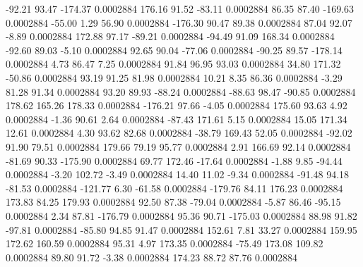       -92.21       93.47     -174.37     0.0002884
      176.16       91.52      -83.11     0.0002884
       86.35       87.40     -169.63     0.0002884
      -55.00        1.29       56.90     0.0002884
     -176.30       90.47       89.38     0.0002884
       87.04       92.07       -8.89     0.0002884
      172.88       97.17      -89.21     0.0002884
      -94.49       91.09      168.34     0.0002884
      -92.60       89.03       -5.10     0.0002884
       92.65       90.04      -77.06     0.0002884
      -90.25       89.57     -178.14     0.0002884
        4.73       86.47        7.25     0.0002884
       91.84       96.95       93.03     0.0002884
       34.80      171.32      -50.86     0.0002884
       93.19       91.25       81.98     0.0002884
       10.21        8.35       86.36     0.0002884
       -3.29       81.28       91.34     0.0002884
       93.20       89.93      -88.24     0.0002884
      -88.63       98.47      -90.85     0.0002884
      178.62      165.26      178.33     0.0002884
     -176.21       97.66       -4.05     0.0002884
      175.60       93.63        4.92     0.0002884
       -1.36       90.61        2.64     0.0002884
      -87.43      171.61        5.15     0.0002884
       15.05      171.34       12.61     0.0002884
        4.30       93.62       82.68     0.0002884
      -38.79      169.43       52.05     0.0002884
      -92.02       91.90       79.51     0.0002884
      179.66       79.19       95.77     0.0002884
        2.91      166.69       92.14     0.0002884
      -81.69       90.33     -175.90     0.0002884
       69.77      172.46      -17.64     0.0002884
       -1.88        9.85      -94.44     0.0002884
       -3.20      102.72       -3.49     0.0002884
       14.40       11.02       -9.34     0.0002884
      -91.48       94.18      -81.53     0.0002884
     -121.77        6.30      -61.58     0.0002884
     -179.76       84.11      176.23     0.0002884
      173.83       84.25      179.93     0.0002884
       92.50       87.38      -79.04     0.0002884
       -5.87       86.46      -95.15     0.0002884
        2.34       87.81     -176.79     0.0002884
       95.36       90.71     -175.03     0.0002884
       88.98       91.82      -97.81     0.0002884
      -85.80       94.85       91.47     0.0002884
      152.61        7.81       33.27     0.0002884
      159.95      172.62      160.59     0.0002884
       95.31        4.97      173.35     0.0002884
      -75.49      173.08      109.82     0.0002884
       89.80       91.72       -3.38     0.0002884
      174.23       88.72       87.76     0.0002884
